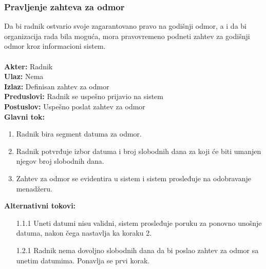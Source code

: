 \documentclass{article}
\begin{document}
\subsubsection{Pravljenje zahteva za odmor}
Da bi radnik ostvario svoje zagarantovano pravo na godišnji odmor, a i da bi organizacija rada bila moguća, mora pravovremeno podneti zahtev za godišnji odmor kroz informacioni sistem.\\\\
\textbf{Akter:} Radnik\\
\textbf{Ulaz:} Nema\\
\textbf{Izlaz:} Definisan zahtev za odmor\\
\textbf{Preduslovi:} Radnik se uspešno prijavio na sistem\\
\textbf{Postuslov:} Uspešno poslat zahtev za odmor\\
\textbf{Glavni tok:}
\begin{enumerate}
\item Radnik bira segment datuma za odmor.
\item Radnik potvrđuje izbor datuma i broj slobodnih dana za koji će biti umanjen njegov broj slobodnih dana.
\item Zahtev za odmor se evidentira u sistem i sistem prosleđuje na odobravanje menadžeru.
\end{enumerate}
\textbf{Alternativni tokovi:} \\
\begin{itemize}
\item [1.1.1] Uneti datumi nisu validni, sistem prosleđuje poruku za ponovno unošnje datuma, nakon čega nastavlja ka koraku 2.
\item [1.2.1] Radnik nema dovoljno slobodnih dana da bi poslao zahtev za odmor sa unetim datumima. Ponavlja se prvi korak.
\end{itemize}
\end{document}
